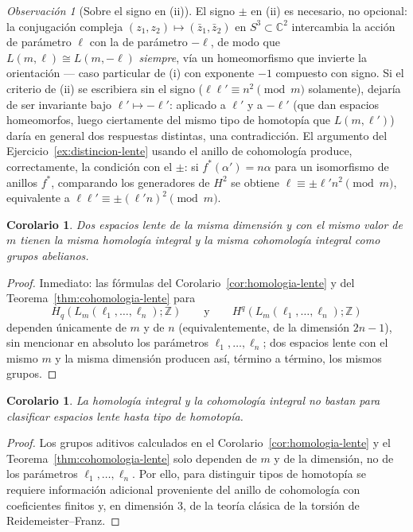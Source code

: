 \documentclass[11pt,a4paper]{article}
\theoremstyle{plain}
\newtheorem{corollary}[theorem]{Corolario}
\theoremstyle{definition}
\theoremstyle{remark}
\newtheorem{remark}[theorem]{Observación}
\newcommand{\ZZ}{\mathbb Z}
\newcommand{\CC}{\mathbb C}
\begin{document}
\begin{remark}[Sobre el signo en (ii)]
\label{obs:signo-clasificacion}
El signo $\pm$ en (ii) es necesario, no opcional: la conjugación compleja
$(z_1,z_2)\mapsto(\bar z_1,\bar z_2)$ en $S^3\subset\CC^2$ intercambia la
acción de parámetro $\ell$ con la de parámetro $-\ell$, de modo que
$L(m,\ell)\cong L(m,-\ell)$ \emph{siempre}, vía un homeomorfismo que
invierte la orientación --- caso particular de (i) con exponente $-1$
compuesto con signo. Si el criterio de (ii) se escribiera sin el signo
($\ell\ell'\equiv n^2\pmod m$ solamente), dejaría de ser invariante bajo
$\ell'\mapsto-\ell'$: aplicado a $\ell'$ y a $-\ell'$ (que dan espacios
homeomorfos, luego ciertamente del mismo tipo de homotopía que
$L(m,\ell')$) daría en general dos respuestas distintas, una
contradicción. El argumento del Ejercicio~\ref{ex:distincion-lente} usando
el anillo de cohomología produce, correctamente, la condición con el
$\pm$: si $f^*(\alpha')=n\alpha$ para un isomorfismo de anillos $f^*$,
comparando los generadores de $H^2$ se obtiene
$\ell\equiv\pm\ell'n^2\pmod m$, equivalente a $\ell\ell'\equiv\pm(\ell'n)^2\pmod m$.
\end{remark}

\begin{corollary}
\label{cor:misma-homologia-lente}
Dos espacios lente de la misma dimensión y con el mismo valor de $m$ tienen
la misma homología integral y la misma cohomología integral como grupos
abelianos.
\end{corollary}

\begin{proof}
Inmediato: las fórmulas del Corolario~\ref{cor:homologia-lente} y del
Teorema~\ref{thm:cohomologia-lente} para
\[
H_q(L_m(\ell_1,\dots,\ell_n);\ZZ) \qquad\text{y}\qquad H^q(L_m(\ell_1,\dots,\ell_n);\ZZ)
\]
dependen únicamente de $m$ y de $n$
(equivalentemente, de la dimensión $2n-1$), sin mencionar en absoluto los
parámetros $\ell_1,\dots,\ell_n$; dos espacios lente con el mismo $m$ y la
misma dimensión producen así, término a término, los mismos grupos.
\end{proof}

\begin{corollary}
\label{cor:homologia-no-clasifica-lente}
La homología integral y la cohomología integral no bastan para clasificar
espacios lente hasta tipo de homotopía.
\end{corollary}

\begin{proof}
Los grupos aditivos calculados en el Corolario~\ref{cor:homologia-lente} y
el Teorema~\ref{thm:cohomologia-lente} solo dependen de $m$ y de la
dimensión, no de los parámetros $\ell_1,\dots,\ell_n$. Por ello, para
distinguir tipos de homotopía se requiere información adicional
proveniente del anillo de cohomología con coeficientes finitos y, en
dimensión $3$, de la teoría clásica de la torsión de Reidemeister--Franz.
\end{proof}
\end{document}
